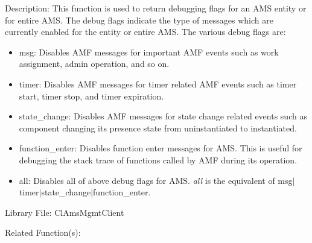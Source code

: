 \begin{Desc}
\item[Description:]This function is used to return debugging flags for an AMS entity or for entire AMS. The debug flags indicate the type of messages which are currently enabled for the entity or entire AMS. The various debug flags are: \begin{itemize}
\item msg: Disables AMF messages for important AMF events such as work assignment, admin operation, and so on. \item timer: Disables AMF messages for timer related AMF events such as timer start, timer stop, and timer expiration. \item state\_\-change: Disables AMF messages for state change related events such as component changing its presence state from uninstantiated to instantiated. \item function\_\-enter: Disables function enter messages for AMS. This is useful for debugging the stack trace of functions called by AMF during its operation. \item all: Disables all of above debug flags for AMS. {\em all\/} is the equivalent of msg$|$timer$|$state\_\-change$|$function\_\-enter.\end{itemize}
\end{Desc}
\begin{Desc}
\item[Library File:]Cl\-Ams\-Mgmt\-Client\end{Desc}
\begin{Desc}
\item[Related Function(s):] \end{Desc}




 \newpage
